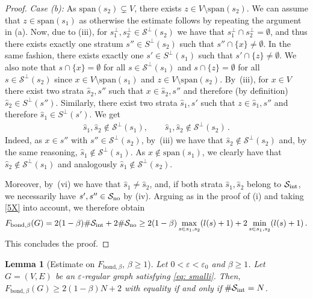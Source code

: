 \documentclass[reqno]{amsart}
\newcommand{\eps}{\varepsilon}
\theoremstyle{plain}
\newtheorem{lemma}[theorem]{Lemma}
\theoremstyle{definition}
\numberwithin{equation}{section}
\begin{document}
\begin{proof}
\noindent \emph{Case {\rm (b)}:}  As $\mathrm{span}(s_2) \subsetneq V$, there exists $z \in V\setminus \mathrm{span}(s_2)$. We can assume that $z \in \mathrm{span}(s_1)$  as otherwise the estimate follows by repeating the argument in (a).  Now, due to (iii), for $s_1^\perp,s_2^\perp\in \mathcal{S}^\perp(s_2)$ we have that $s_1^\perp \cap s_2^\perp=\emptyset$,  and thus   there exists  exactly  one stratum $s''\in S^\perp(s_2)$ such that $s''\cap \{x\} \neq \emptyset$. In the same fashion, there exists exactly one  $s' \in S^\perp(s_1)$  such that $s'\cap \{z\} \neq \emptyset$.  We also note that $s\cap \{x\} = \emptyset$ for all $s\in \mathcal{S}^\perp(s_1)$ and $s\cap \{z\} = \emptyset$ for all $s\in \mathcal{S}^\perp(s_2)$ since $x \in V \setminus \mathrm{span}(s_1)$ and $z \in V\setminus \mathrm{span}(s_2)$. By~(iii),  for  $x\in V$ there exist two strata $\hat{s}_2, s''$ such that $x\in \hat{s}_2, s''$ and therefore (by definition) $\hat{s}_2 \in  S^\perp(s'')  $. Similarly, there exist two strata $\hat{s}_1, s'$ such that $ z \in \hat{s}_1, s''$ and therefore $\hat{s}_1 \in S^\perp(s')$.  We get 
\begin{align}\label{5X}
\hat{s}_1, \hat{s}_2 \notin \mathcal{S}^\perp(s_1), \quad \quad  \hat{s}_1, \hat{s}_2 \notin \mathcal{S}^\perp(s_2)\,.
\end{align}
Indeed,  as $x \in s''$ with $s'' \in \mathcal{S}^\perp(s_2)$, by~(iii) we have that  $\hat{s}_2 \notin \mathcal{S}^\perp(s_2)$ and, by the same reasoning, $\hat{s}_1 \notin \mathcal{S}^\perp(s_1)$. As $x \notin \mathrm{span}(s_1)$, we clearly have that $\hat{s}_2 \notin \mathcal{S}^\perp(s_1)$ and analogously $\hat{s}_1 \notin \mathcal{S}^\perp(s_2)$. 

Moreover,  by~(vi) we have that $\hat{s}_1 \neq \hat{s}_2$, and, if both strata $\hat{s}_1, \hat{s}_2$ belong to $\mathcal{S}_{\rm int}$,  we necessarily have    $s', s''\in \mathcal{S}_{\rm no}$ by (iv).  Arguing as in the proof of (i) and taking \eqref{5X} into account, we  therefore obtain 
\begin{align*}
 F_{\mathrm{bond},\beta} (G)  =  2(1-\beta) \#\mathcal{S}_{\rm int} + 2\#\mathcal{S}_{\rm no} \geq 2(1-\beta)\max_{s \in s_1,s_2} (l(s)+1) + 2\min_{s \in s_1,s_2} (l(s)+1) \,.
\end{align*}
This concludes the proof. 
\end{proof}



\begin{lemma}[Estimate on $F_{\mathrm{bond},\beta}$, $\beta \ge 1$]\label{lem:orthogonalstrata2}  Let $0 <\eps < \eps_0  $ and $\beta \ge 1$. Let  $G=(V,E)$ be an $\eps$-regular graph satisfying \eqref{eq: smalli}. Then,  $ F_{\mathrm{bond}, \beta }  (G) \geq 2(1-\beta) N + 2$ with equality if and only if $\#\mathcal{S}_{\rm int} = N$.  
\end{lemma}
\end{document}
